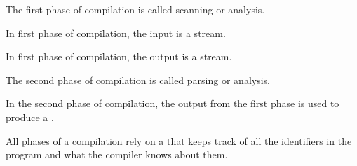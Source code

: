 

\renewcommand\Author{nweadick1@cougars.ccis.edu} %


\topmattertwo

\nextq
The first phase of compilation is called scanning or 
 analysis.

\nextq
In first phase of compilation, the input is a  stream.

\nextq
In first phase of compilation, the output is a  stream.

\nextq
The second phase of compilation is called parsing or  analysis.

\nextq
In the second phase of compilation, the output from the first phase is used to produce a .

\nextq
All phases of a compilation rely on a  that keeps
track of all the identifiers in the program and what the
compiler knows about them.

\newpage




